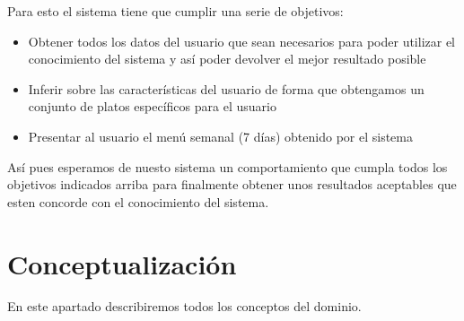 \documentclass[12]{article}
\begin{document}
Para esto el sistema tiene que cumplir una serie de objetivos: 
\begin{itemize}
	\item Obtener todos los datos del usuario que sean necesarios para poder utilizar el conocimiento del sistema y así poder devolver el mejor resultado posible
	\item Inferir sobre las características del usuario de forma que obtengamos un conjunto de platos específicos para el usuario
	\item Presentar al usuario el menú semanal (7 días) obtenido por el sistema		
\end{itemize}

Así pues esperamos de nuesto sistema un comportamiento que cumpla todos los objetivos indicados arriba para finalmente obtener unos resultados aceptables que esten concorde con el conocimiento del sistema. 
\section{Conceptualización}
En este apartado describiremos todos los conceptos del dominio. 
\end{document}
